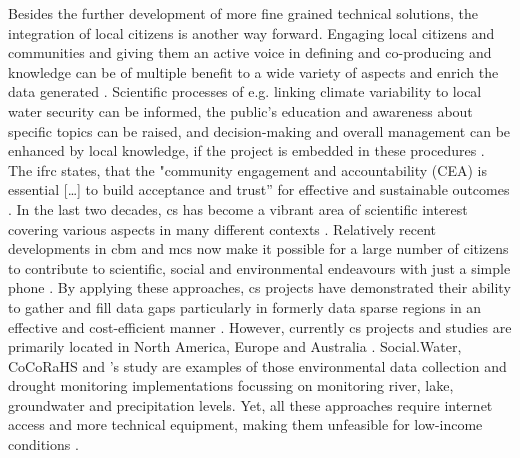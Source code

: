 Besides the further development of more fine grained technical solutions, the integration of local citizens is another way forward. Engaging local citizens and communities and giving them an active voice in defining and co-producing  and knowledge can be of multiple benefit to a wide variety of aspects and enrich the data generated \autocite{scrsFeasibilityStudyPotential2022, njambi-szlapkaIntegratingCommunityVoices}. Scientific processes of e.g. linking climate variability to local water security can be informed, the public's education and awareness about specific topics can be raised, and decision-making and overall management can be enhanced by local knowledge, if the project is embedded in these procedures \autocite{huangManagementDrinkingWater2020,kirschkeCitizenScienceProjects2022,minkmanCitizenScienceWater2015}. The \acrshort{ifrc} states, that the "community engagement and accountability (CEA) is essential […] to build acceptance and trust” for effective and sustainable outcomes \autocite{ifrcCommunityEngagementAccountability}.\newline
In the last two decades, \acrlong{cs} has become a vibrant area of scientific interest covering various aspects in many different contexts \autocite{kirschkeCitizenScienceProjects2022,kullenbergWhatCitizenScience2016}. Relatively recent developments in \acrlong{cbm} and \acrlong{mcs} now make it possible for a large number of citizens to contribute to scientific, social and environmental endeavours with just a simple phone \autocite{butteFrameworkWaterSecurity2022}. By applying these approaches, \acrshort{cs} projects have demonstrated their ability to gather and fill data gaps particularly in formerly data sparse regions in an effective and cost-efficient manner \autocite{butteFrameworkWaterSecurity2022,lackstromBackyardHydroclimatologyCitizen2022,weeserCitizenSciencePioneers2018a}. However, currently \acrshort{cs} projects and studies are primarily located in North America, Europe and Australia \autocite{kirschkeCitizenScienceProjects2022, koehlerCitizenParticipationCollaborative2008, livinglakescanadaElevatingCommunityBased2018}. Social.Water, CoCoRaHS and \autocite{speirSolutionsCurrentChallenges2022}'s study are examples of those environmental data collection and drought monitoring implementations focussing on monitoring river, lake, groundwater and precipitation levels. Yet, all these approaches require internet access and more technical equipment, making them unfeasible for low-income conditions \autocite{fienenSocialWaterCrowdsourcing2012a,lackstromBackyardHydroclimatologyCitizen2022,lowryGrowingPainsCrowdsourced2019}.\newline
